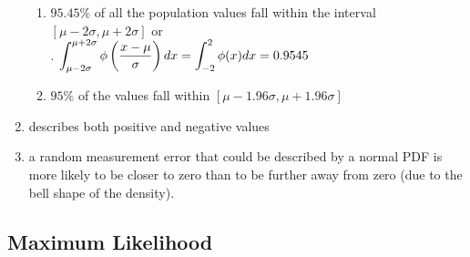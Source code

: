\begin{enumerate}
\begin{enumerate}
        \item $95.45\%$ of all the population values fall within the interval $[\mu - 2\sigma, \mu + 2\sigma]$ or
        \hfill \cite{statistics/book/Statistics-for-Data-Scientists/Maurits-Kaptein}
        \\[0.2cm]
        .\hfill
        $
            \displaystyle\int_{\mu - 2\sigma}^{\mu + 2\sigma}
            \phi\left(\dfrac{x-\mu}{\sigma}\right) dx
            =
            \displaystyle\int_{-2}^{2}
            \phi(x) dx
            =
            0.9545
        $
        \hfill \cite{statistics/book/Statistics-for-Data-Scientists/Maurits-Kaptein}

        \item $95\%$ of the values fall within $[\mu - 1.96\sigma, \mu + 1.96\sigma]$
        \hfill \cite{statistics/book/Statistics-for-Data-Scientists/Maurits-Kaptein}
    \end{enumerate}

    \item  describes both positive and negative values
    \hfill \cite{statistics/book/Statistics-for-Data-Scientists/Maurits-Kaptein}

    \item a random measurement error that could be described by a normal PDF is more likely to be closer to zero than to be further away from zero (due to the bell shape of the density).
    \hfill \cite{statistics/book/Statistics-for-Data-Scientists/Maurits-Kaptein}
\end{enumerate}









\subsection{Maximum Likelihood}

